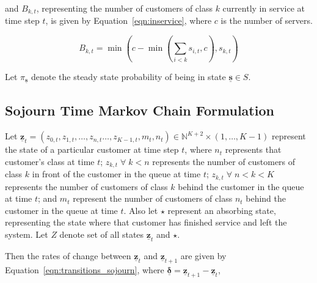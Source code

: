 \documentclass{article}
\begin{document}
and $B_{k,t}$, representing the number of customers of class $k$ currently in
service at time step $t$, is given by Equation~\ref{eqn:inservice}, where $c$
is the number of servers.

\begin{equation}\label{eqn:inservice}
B_{k,t} =\min\left(c - \min\left(\sum_{i < k} s_{i,t}, c\right), s_{k,t}\right)
\end{equation}

Let $\pi_{\underline{\mathbf{s}}}$ denote the steady state probability of being
in state $\underline{\mathbf{s}} \in S$.



\subsection{Sojourn Time Markov Chain Formulation}\label{sec:sojourn_formulation}
Let $\underline{\mathbf{z}}_t = (z_{0,t}, z_{1,t}, \dots, z_{n,t} \dots, z_{K-1,t}, m_t, n_t) \in \mathbb{N}^{K+2} \times (1, \dots, K - 1)$
represent the state of a particular customer at time step $t$, where $n_t$
represents that customer's class at time $t$; $z_{k,t} \; \forall \; k < n$
represents the number of customers of class $k$ in front of the customer in the
queue at time $t$; $z_{k,t} \; \forall \; n < k < K$ represents the number of
customers of class $k$ behind the customer in the queue at time $t$; and $m_t$
represent the number of customers of class $n_t$ behind the customer in the
queue at time $t$.
Also let $\star$ represent an absorbing state, representing the state where that
customer has finished service and left the system.
Let $Z$ denote set of all states $\underline{\mathbf{z}}_t$ and $\star$. 


Then the rates of change between $\underline{\mathbf{z}}_t$ and
$\underline{\mathbf{z}}_{t+1}$ are given by Equation~\ref{eqn:transitions_sojourn},
where $\underline{\mathbf{\delta}} = \underline{\mathbf{z}}_{t+1} - \underline{\mathbf{z}}_t$,
\end{document}
